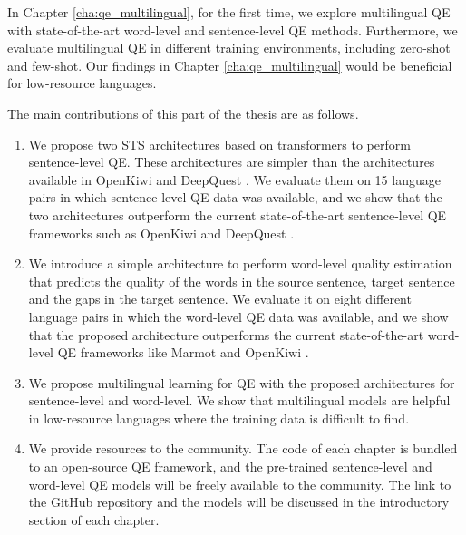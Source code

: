 In Chapter \ref{cha:qe_multilingual}, for the first time, we explore multilingual QE with state-of-the-art word-level and sentence-level QE methods. Furthermore, we evaluate multilingual QE in different training environments, including zero-shot and few-shot. Our findings in Chapter \ref{cha:qe_multilingual} would be beneficial for low-resource languages. 


The main contributions of this part of the thesis are as follows.

\begin{enumerate}

	\item We propose two STS architectures based on transformers to perform sentence-level QE. These architectures are simpler than the  architectures available in OpenKiwi \autocite{kepler-etal-2019-openkiwi} and DeepQuest \autocite{ive-etal-2018-deepquest}. We evaluate them on 15 language pairs in which sentence-level QE data was available, and we show that the two architectures outperform the current state-of-the-art sentence-level QE frameworks such as OpenKiwi \autocite{kepler-etal-2019-openkiwi} and DeepQuest \autocite{ive-etal-2018-deepquest}.
	
	
	\item We introduce a simple architecture to perform word-level quality estimation that predicts the quality of the words in the source sentence, target sentence and the gaps in the target sentence. We evaluate it on eight different language pairs in which the word-level QE data was available, and we show that the proposed architecture outperforms the current state-of-the-art word-level QE frameworks like Marmot \autocite{logacheva-etal-2016-marmot} and OpenKiwi \autocite{kepler-etal-2019-openkiwi}.

	\item We propose multilingual learning for QE with the proposed architectures for sentence-level and word-level. We show that multilingual models are helpful in low-resource languages where the training data is difficult to find. 
	
	\item We provide resources to the community. The code of each chapter is bundled to an open-source QE framework, and the pre-trained sentence-level and word-level QE models will be freely available to the community.  The link to the GitHub repository and the models will be discussed in the introductory section of each chapter. 
\end{enumerate}

